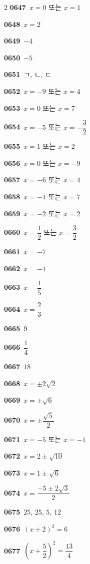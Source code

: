 \documentclass[10pt,a4paper]{article}
\begin{document}
\begin{multicols}{2}
\noindent\textbf{0647}\ $x=0$ 또는 $x=1$\par
\noindent\textbf{0648}\ $x=2$\par
\noindent\textbf{0649}\ $-4$\par
\noindent\textbf{0650}\ $-5$\par
\noindent\textbf{0651}\ ㄱ, ㄴ, ㄷ\par
\noindent\textbf{0652}\ $x=-9$ 또는 $x=4$\par
\noindent\textbf{0653}\ $x=0$ 또는 $x=7$\par
\noindent\textbf{0654}\ $x=-5$ 또는 $x=-\dfrac{3}{2}$\par
\noindent\textbf{0655}\ $x=1$ 또는 $x=2$\par
\noindent\textbf{0656}\ $x=0$ 또는 $x=-9$\par
\noindent\textbf{0657}\ $x=-6$ 또는 $x=4$\par
\noindent\textbf{0658}\ $x=-1$ 또는 $x=7$\par
\noindent\textbf{0659}\ $x=-2$ 또는 $x=2$\par
\noindent\textbf{0660}\ $x=\dfrac{1}{2}$ 또는 $x=\dfrac{3}{2}$\par
\noindent\textbf{0661}\ $x=-7$\par
\noindent\textbf{0662}\ $x=-1$\par
\noindent\textbf{0663}\ $x=\dfrac{1}{5}$\par
\noindent\textbf{0664}\ $x=\dfrac{2}{3}$\par
\noindent\textbf{0665}\ $9$\par
\noindent\textbf{0666}\ $\dfrac{1}{4}$\par
\noindent\textbf{0667}\ $18$\par
\noindent\textbf{0668}\ $x=\pm2\sqrt{2}$\par
\noindent\textbf{0669}\ $x=\pm\sqrt{6}$\par
\noindent\textbf{0670}\ $x=\pm\dfrac{\sqrt{5}}{2}$\par
\noindent\textbf{0671}\ $x=-5$ 또는 $x=-1$\par
\noindent\textbf{0672}\ $x=2\pm\sqrt{10}$\par
\noindent\textbf{0673}\ $x=1\pm\sqrt{6}$\par
\noindent\textbf{0674}\ $x=\dfrac{-5\pm2\sqrt{3}}{2}$\par
\noindent\textbf{0675}\ $25$, $25$, $5$, $12$\par
\noindent\textbf{0676}\ $(x+2)^2=6$\par
\noindent\textbf{0677}\ $\left(x+\dfrac{5}{2}\right)^2=\dfrac{13}{4}$\par

\end{multicols}
\end{document}
